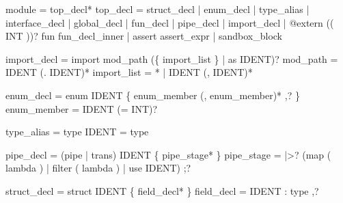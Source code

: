 \documentclass[
  11pt,
]{article}
\newenvironment{Shaded}{\begin{snugshade}}{\end{snugshade}}
\newcommand{\NormalTok}[1]{#1}
\begin{document}
\begin{Shaded}
\begin{Highlighting}[]
\NormalTok{module      = top\_decl*}
\NormalTok{top\_decl    = struct\_decl}
\NormalTok{            | enum\_decl}
\NormalTok{            | type\_alias}
\NormalTok{            | interface\_decl}
\NormalTok{            | global\_decl}
\NormalTok{            | fun\_decl}
\NormalTok{            | pipe\_decl}
\NormalTok{            | import\_decl}
\NormalTok{            | \textquotesingle{}@extern\textquotesingle{} (\textquotesingle{}(\textquotesingle{} INT \textquotesingle{})\textquotesingle{})? \textquotesingle{}fun\textquotesingle{} fun\_decl\_inner}
\NormalTok{            | \textquotesingle{}assert\textquotesingle{} assert\_expr}
\NormalTok{            | sandbox\_block}

\NormalTok{import\_decl    = \textquotesingle{}import\textquotesingle{} mod\_path (\textquotesingle{}\{\textquotesingle{} import\_list \textquotesingle{}\}\textquotesingle{} | \textquotesingle{}as\textquotesingle{} IDENT)?}
\NormalTok{mod\_path       = IDENT (\textquotesingle{}.\textquotesingle{} IDENT)*}
\NormalTok{import\_list    = \textquotesingle{}*\textquotesingle{} | IDENT (\textquotesingle{},\textquotesingle{} IDENT)*}

\NormalTok{enum\_decl      = \textquotesingle{}enum\textquotesingle{} IDENT \textquotesingle{}\{\textquotesingle{} enum\_member (\textquotesingle{},\textquotesingle{} enum\_member)* \textquotesingle{},\textquotesingle{}? \textquotesingle{}\}\textquotesingle{}}
\NormalTok{enum\_member    = IDENT (\textquotesingle{}=\textquotesingle{} INT)?}

\NormalTok{type\_alias     = \textquotesingle{}type\textquotesingle{} IDENT \textquotesingle{}=\textquotesingle{} type}

\NormalTok{pipe\_decl      = (\textquotesingle{}pipe\textquotesingle{} | \textquotesingle{}trans\textquotesingle{}) IDENT \textquotesingle{}\{\textquotesingle{} pipe\_stage* \textquotesingle{}\}\textquotesingle{}}
\NormalTok{pipe\_stage     = \textquotesingle{}|\textgreater{}\textquotesingle{}? (\textquotesingle{}map\textquotesingle{} \textquotesingle{}(\textquotesingle{} lambda \textquotesingle{})\textquotesingle{} | \textquotesingle{}filter\textquotesingle{} \textquotesingle{}(\textquotesingle{} lambda \textquotesingle{})\textquotesingle{}}
\NormalTok{               | \textquotesingle{}use\textquotesingle{} IDENT) \textquotesingle{};\textquotesingle{}?}

\NormalTok{struct\_decl    = \textquotesingle{}struct\textquotesingle{} IDENT \textquotesingle{}\{\textquotesingle{} field\_decl* \textquotesingle{}\}\textquotesingle{}}
\NormalTok{field\_decl     = IDENT \textquotesingle{}:\textquotesingle{} type \textquotesingle{},\textquotesingle{}?}


\end{Highlighting}
\end{Shaded}
\end{document}
